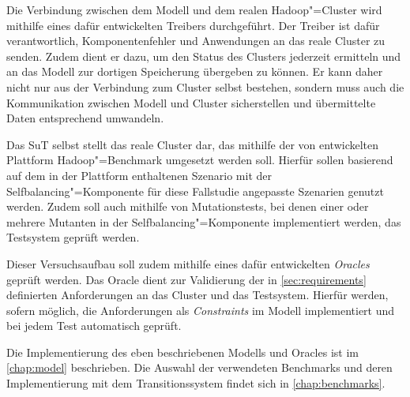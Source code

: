 Die Verbindung zwischen dem Modell und dem realen Hadoop"=Cluster wird mithilfe eines dafür entwickelten Treibers durchgeführt.
Der Treiber ist dafür verantwortlich, Komponentenfehler und Anwendungen an das reale Cluster zu senden.
Zudem dient er dazu, um den Status des Clusters jederzeit ermitteln und an das Modell zur dortigen Speicherung übergeben zu können.
Er kann daher nicht nur aus der Verbindung zum Cluster selbst bestehen, sondern muss auch die Kommunikation zwischen Modell und Cluster sicherstellen und übermittelte Daten entsprechend umwandeln.

Das \ac{SuT} selbst stellt das reale Cluster dar, das mithilfe der von \citeauthor{zhang2016} entwickelten Plattform Hadoop"=Benchmark umgesetzt werden soll.
Hierfür sollen basierend auf dem in der Plattform enthaltenen Szenario mit der Selfbalancing"=Komponente für diese Fallstudie angepasste Szenarien genutzt werden.
Zudem soll auch mithilfe von Mutationstests, bei denen einer oder mehrere Mutanten in der Selfbalancing"=Komponente implementiert werden, das Testsystem geprüft werden.

Dieser Versuchsaufbau soll zudem mithilfe eines dafür entwickelten \emph{Oracles} geprüft werden.
Das Oracle dient zur Validierung der in \autoref{sec:requirements} definierten Anforderungen an das Cluster und das Testsystem.
Hierfür werden, sofern möglich, die Anforderungen als \emph{Constraints} im Modell implementiert und bei jedem Test automatisch geprüft.

Die Implementierung des eben beschriebenen Modells und Oracles ist im \autoref{chap:model} beschrieben.
Die Auswahl der verwendeten Benchmarks und deren Implementierung mit dem Transitionssystem findet sich in \autoref{chap:benchmarks}.
